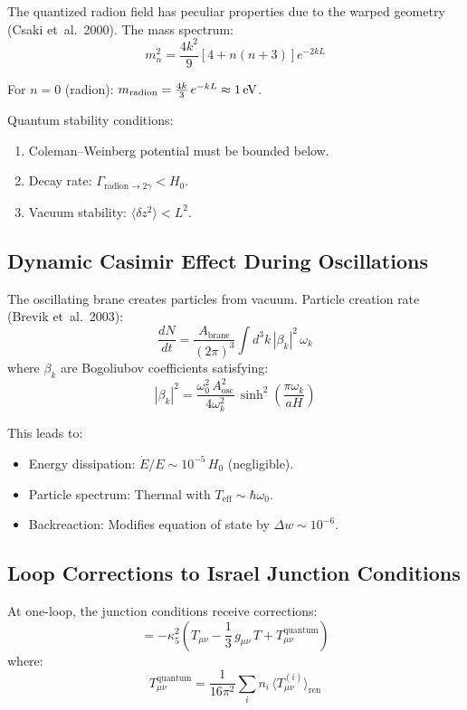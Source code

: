 The quantized radion field has peculiar properties due to the warped geometry (Csaki et~al.\ 2000). The mass spectrum:
\begin{equation}
m_n^2 = \frac{4k^2}{9}\left[4 + n(n+3)\right]e^{-2kL}
\end{equation}

For $n = 0$ (radion): $m_\text{radion} = \frac{4k}{3}\,e^{-kL} \approx 1\,\text{eV}$.

Quantum stability conditions:
\begin{enumerate}
  \item Coleman--Weinberg potential must be bounded below.
  \item Decay rate: $\Gamma_{\text{radion} \to 2\gamma} < H_0$.
  \item Vacuum stability: $\langle\delta z^2\rangle < L^2$.
\end{enumerate}

\subsection{Dynamic Casimir Effect During Oscillations}

The oscillating brane creates particles from vacuum. Particle creation rate (Brevik et~al.\ 2003):
\begin{equation}
\frac{dN}{dt} = \frac{A_\text{brane}}{(2\pi)^3}\int d^3k\,|\beta_k|^2\,\omega_k
\end{equation}
where $\beta_k$ are Bogoliubov coefficients satisfying:
\begin{equation}
|\beta_k|^2 = \frac{\omega_0^2\,A_\text{osc}^2}{4\omega_k^2}\,\sinh^2\!\left(\frac{\pi\omega_k}{aH}\right)
\end{equation}

This leads to:
\begin{itemize}
  \item Energy dissipation: $\dot{E}/E \sim 10^{-5}\,H_0$ (negligible).
  \item Particle spectrum: Thermal with $T_\text{eff} \sim \hbar\omega_0$.
  \item Backreaction: Modifies equation of state by $\Delta w \sim 10^{-6}$.
\end{itemize}

\subsection{Loop Corrections to Israel Junction Conditions}

At one-loop, the junction conditions receive corrections:
\begin{equation}
[K_{\mu\nu}] = -\kappa_5^2\left(T_{\mu\nu} - \frac{1}{3}\,g_{\mu\nu}\,T + T_{\mu\nu}^\text{quantum}\right)
\end{equation}
where:
\begin{equation}
T_{\mu\nu}^\text{quantum} = \frac{1}{16\pi^2}\sum_i n_i\,\langle T_{\mu\nu}^{(i)}\rangle_\text{ren}
\end{equation}

